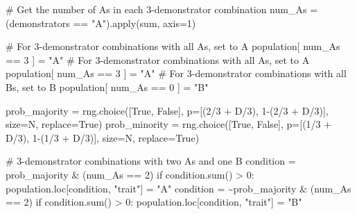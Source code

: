 \documentclass[
  a4paperpaper,
  ,captions=tableheading
]{scrbook}
\newenvironment{Shaded}{\begin{snugshade}}{\end{snugshade}}
\newcommand{\BuiltInTok}[1]{\textcolor[rgb]{0.00,0.23,0.31}{#1}}
\newcommand{\CommentTok}[1]{\textcolor[rgb]{0.37,0.37,0.37}{#1}}
\newcommand{\ControlFlowTok}[1]{\textcolor[rgb]{0.00,0.23,0.31}{#1}}
\newcommand{\DecValTok}[1]{\textcolor[rgb]{0.68,0.00,0.00}{#1}}
\newcommand{\NormalTok}[1]{\textcolor[rgb]{0.00,0.23,0.31}{#1}}
\newcommand{\OperatorTok}[1]{\textcolor[rgb]{0.37,0.37,0.37}{#1}}
\newcommand{\StringTok}[1]{\textcolor[rgb]{0.13,0.47,0.30}{#1}}
\newcommand{\VariableTok}[1]{\textcolor[rgb]{0.07,0.07,0.07}{#1}}
\begin{document}
\begin{Shaded}
\begin{Highlighting}[]
            \CommentTok{\# Get the number of A\textquotesingle{}s in each 3{-}demonstrator combination}
\NormalTok{            num\_As }\OperatorTok{=}\NormalTok{ (demonstrators }\OperatorTok{==} \StringTok{"A"}\NormalTok{).}\BuiltInTok{apply}\NormalTok{(}\BuiltInTok{sum}\NormalTok{, axis}\OperatorTok{=}\DecValTok{1}\NormalTok{)}

            \CommentTok{\# For 3{-}demonstrator combinations with all A\textquotesingle{}s, set to A}
\NormalTok{            population[ num\_As }\OperatorTok{==} \DecValTok{3}\NormalTok{ ] }\OperatorTok{=} \StringTok{"A"}
            \CommentTok{\# For 3{-}demonstrator combinations with all A\textquotesingle{}s, set to A}
\NormalTok{            population[ num\_As }\OperatorTok{==} \DecValTok{3}\NormalTok{ ] }\OperatorTok{=} \StringTok{"A"}
            \CommentTok{\# For 3{-}demonstrator combinations with all B\textquotesingle{}s, set to B}
\NormalTok{            population[ num\_As }\OperatorTok{==} \DecValTok{0}\NormalTok{ ] }\OperatorTok{=} \StringTok{"B"}

\NormalTok{            prob\_majority }\OperatorTok{=}\NormalTok{ rng.choice([}\VariableTok{True}\NormalTok{, }\VariableTok{False}\NormalTok{], p}\OperatorTok{=}\NormalTok{[(}\DecValTok{2}\OperatorTok{/}\DecValTok{3} \OperatorTok{+}\NormalTok{ D}\OperatorTok{/}\DecValTok{3}\NormalTok{), }\DecValTok{1}\OperatorTok{{-}}\NormalTok{(}\DecValTok{2}\OperatorTok{/}\DecValTok{3} \OperatorTok{+}\NormalTok{ D}\OperatorTok{/}\DecValTok{3}\NormalTok{)], size}\OperatorTok{=}\NormalTok{N, replace}\OperatorTok{=}\VariableTok{True}\NormalTok{)}
\NormalTok{            prob\_minority }\OperatorTok{=}\NormalTok{ rng.choice([}\VariableTok{True}\NormalTok{, }\VariableTok{False}\NormalTok{], p}\OperatorTok{=}\NormalTok{[(}\DecValTok{1}\OperatorTok{/}\DecValTok{3} \OperatorTok{+}\NormalTok{ D}\OperatorTok{/}\DecValTok{3}\NormalTok{), }\DecValTok{1}\OperatorTok{{-}}\NormalTok{(}\DecValTok{1}\OperatorTok{/}\DecValTok{3} \OperatorTok{+}\NormalTok{ D}\OperatorTok{/}\DecValTok{3}\NormalTok{)], size}\OperatorTok{=}\NormalTok{N, replace}\OperatorTok{=}\VariableTok{True}\NormalTok{)}

            \CommentTok{\# 3{-}demonstrator combinations with two As and one B}
\NormalTok{            condition }\OperatorTok{=}\NormalTok{ prob\_majority }\OperatorTok{\&}\NormalTok{ (num\_As }\OperatorTok{==} \DecValTok{2}\NormalTok{)}
            \ControlFlowTok{if}\NormalTok{ condition.}\BuiltInTok{sum}\NormalTok{() }\OperatorTok{\textgreater{}} \DecValTok{0}\NormalTok{:}
\NormalTok{                population.loc[condition, }\StringTok{"trait"}\NormalTok{] }\OperatorTok{=} \StringTok{"A"}
\NormalTok{            condition }\OperatorTok{=} \OperatorTok{\textasciitilde{}}\NormalTok{prob\_majority }\OperatorTok{\&}\NormalTok{ (num\_As }\OperatorTok{==} \DecValTok{2}\NormalTok{)}
            \ControlFlowTok{if}\NormalTok{ condition.}\BuiltInTok{sum}\NormalTok{() }\OperatorTok{\textgreater{}} \DecValTok{0}\NormalTok{:}
\NormalTok{                population.loc[condition, }\StringTok{"trait"}\NormalTok{] }\OperatorTok{=} \StringTok{"B"}


\end{Highlighting}
\end{Shaded}
\end{document}
